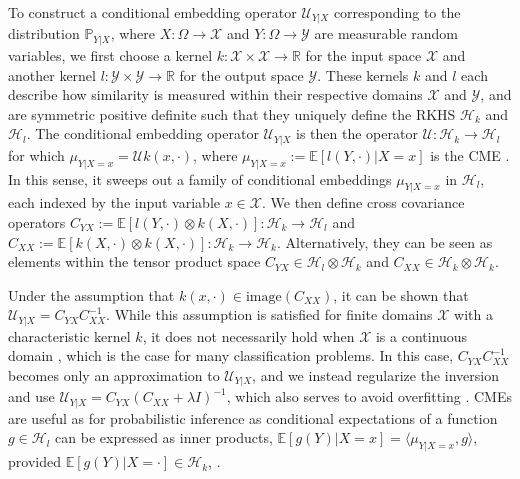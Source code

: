 \documentclass[twoside]{article}
\begin{document}
			To construct a conditional embedding operator $\mathcal{U}_{Y | X}$ corresponding to the distribution $\mathbb{P}_{Y | X}$, where $X : \Omega \to \mathcal{X}$ and $Y: \Omega \to \mathcal{Y}$ are measurable random variables, we first choose a kernel $k : \mathcal{X} \times \mathcal{X} \to \mathbb{R}$ for the input space $\mathcal{X}$ and another kernel $l : \mathcal{Y} \times \mathcal{Y} \to \mathbb{R}$ for the output space $\mathcal{Y}$. These kernels $k$ and $l$ each describe how similarity is measured within their respective domains $\mathcal{X}$ and $\mathcal{Y}$, and are symmetric positive definite such that they uniquely define the \gls{RKHS} $\mathcal{H}_{k}$ and $\mathcal{H}_{l}$. The conditional embedding operator $\mathcal{U}_{Y | X}$ is then the operator $\mathcal{U} : \mathcal{H}_{k} \to \mathcal{H}_{l}$ for which $\mu_{Y | X = x} = \mathcal{U} k(x, \cdot)$, where $\mu_{Y | X = x} := \mathbb{E}[l(Y, \cdot) | X = x]$ is the \gls{CME} \citep{song2009hilbert}. In this sense, it sweeps out a family of conditional embeddings $\mu_{Y | X = x}$ in $\mathcal{H}_{l}$, each indexed by the input variable $x \in \mathcal{X}$. We then define cross covariance operators $C_{YX} := \mathbb{E}[l(Y, \cdot) \otimes k(X, \cdot)] : \mathcal{H}_{k} \to \mathcal{H}_{l}$ and $C_{XX} := \mathbb{E}[k(X, \cdot) \otimes k(X, \cdot)] : \mathcal{H}_{k} \to \mathcal{H}_{k}$. Alternatively, they can be seen as elements within the tensor product space $C_{YX} \in \mathcal{H}_{l} \otimes \mathcal{H}_{k}$ and $C_{XX} \in \mathcal{H}_{k} \otimes \mathcal{H}_{k}$.
			
			Under the assumption that $k(x, \cdot) \in \mathrm{image}(C_{XX})$, it can be shown that $\mathcal{U}_{Y | X} = C_{YX} C_{XX}^{-1}$. While this assumption is satisfied for finite domains $\mathcal{X}$ with a characteristic kernel $k$, it does not necessarily hold when $\mathcal{X}$ is a continuous domain \citep{fukumizu2004dimensionality}, which is the case for many classification problems. In this case, $C_{YX} C_{XX}^{-1}$ becomes only an approximation to $\mathcal{U}_{Y | X}$, and we instead regularize the inversion and use $\mathcal{U}_{Y | X} = C_{YX} (C_{XX} + \lambda I)^{-1}$, which also serves to avoid overfitting \citep{song2013kernel}. \glspl{CME} are useful as for probabilistic inference as conditional expectations of a function $g \in \mathcal{H}_{l}$ can be expressed as inner products, $\mathbb{E}[g(Y) | X = x] = \langle \mu_{Y | X = x}, g \rangle$, provided $\mathbb{E}[g(Y) | X = \cdot] \in \mathcal{H}_{k}$, \citet[Theorem 4]{song2009hilbert}.
				
\end{document}
